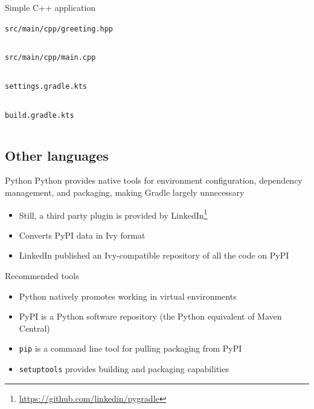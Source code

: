 \documentclass[presentation]{beamer}
\newcommand{\codefile}[4]{
	\begin{block}{\texttt{#2}}
		\inputminted[fontsize=#3,linenos=true,breaklines=true]{#4}{"workspace/#1/#2"}
	\end{block}
}
\newcommand{\ccode}[3]{\codefile{#1}{#2}{#3}{c}}
\newcommand{\groovy}[3]{\codefile{#1}{#2}{#3}{groovy}}
\newcommand{\fnurl}[1]{\footnote{\url{#1}}}
\begin{document}
\begin{frame}{Simple C++ application}
    \ccode{18-CPP}{src/main/cpp/greeting.hpp}{\normalsize}
    \ccode{18-CPP}{src/main/cpp/main.cpp}{\normalsize}
    \groovy{18-CPP}{settings.gradle.kts}{\normalsize}
    \groovy{18-CPP}{build.gradle.kts}{\normalsize}
\end{frame}

\subsection{Other languages}

\begin{frame}[fragile]{Python}
    Python provides native tools for environment configuration, dependency management, and packaging, making Gradle largely unnecessary
    \begin{itemize}
        \item Still, a third party plugin is provided by LinkedIn\fnurl{https://github.com/linkedin/pygradle}
        \item Converts PyPI data in Ivy format
        \item LinkedIn published an Ivy-compatible repository of all the code on PyPI
    \end{itemize}
    \begin{block}{Recommended tools}
        \begin{itemize}
            \item Python natively promotes working in virtual environments
            \item PyPI is a Python software repository (the Python equivalent of Maven Central)
            \item \texttt{pip} is a command line tool for pulling packaging from PyPI
            \item \texttt{setuptools} provides building and packaging capabilities
        \end{itemize}
    \end{block}
\end{frame}    
\end{document}
